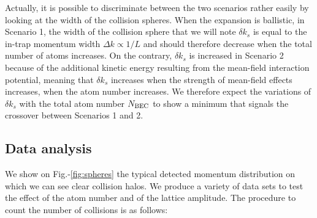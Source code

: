 Actually, it is possible to discriminate between the two scenarios rather easily by looking at the width of the collision spheres. When the expansion is ballistic, \ie in Scenario 1, the width of the collision sphere that we will note $\delta k_s$ is equal to the in-trap momentum width $\Delta k \propto 1/L$ and should therefore decrease when the total number of atoms increases. On the contrary, $\delta k_s$ is increased in Scenario 2 because of the additional kinetic energy resulting from the mean-field interaction potential, meaning that $\delta k_s$ increases when the strength of mean-field effects increases, \ie when the atom number increases. We therefore expect the variations of $\delta k_s$ with the total atom number $N_{\rm{BEC}}$ to show a minimum that signals the crossover between Scenarios 1 and 2.

\subsection{Data analysis}

\label{sec:data_analysis_collisions}

We show on Fig.-\ref{fig:spheres} the typical detected momentum distribution on which we can see clear collision halos. We produce a variety of data sets to test the effect of the atom number and of the lattice amplitude. The procedure to count the number of collisions is as follows:


